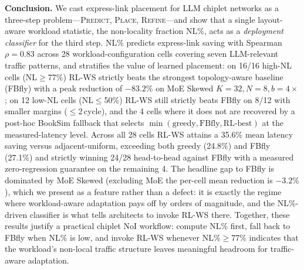 \documentclass[conference]{IEEEtran}
\begin{document}
\textbf{Conclusion.} We cast express-link placement for LLM chiplet networks as a three-step problem---\textsc{Predict}, \textsc{Place}, \textsc{Refine}---and show that a single layout-aware workload statistic, the non-locality fraction NL\%, acts as a \textit{deployment classifier} for the third step. NL\% predicts express-link saving with Spearman $\rho=0.83$ across 28 workload-configuration cells covering seven LLM-relevant traffic patterns, and stratifies the value of learned placement: on 16/16 high-NL cells (NL$\ge$77\%) RL-WS strictly beats the strongest topology-aware baseline (FBfly) with a peak reduction of $-83.2\%$ on MoE Skewed $K{=}32, N{=}8, b{=}4\times$; on 12 low-NL cells (NL$\le$50\%) RL-WS still strictly beats FBfly on 8/12 with smaller margins ($\le$2\,cycle), and the 4 cells where it does not are recovered by a post-hoc BookSim fallback that selects $\min(\text{greedy}, \text{FBfly}, \text{RL-best})$ at the measured-latency level. Across all 28 cells RL-WS attains a 35.6\% mean latency saving versus adjacent-uniform, exceeding both greedy (24.8\%) and FBfly (27.1\%) and strictly winning 24/28 head-to-head against FBfly with a measured zero-regression guarantee on the remaining 4. The headline gap to FBfly is dominated by MoE Skewed (excluding MoE the per-cell mean reduction is $-3.2\%$), which we present as a feature rather than a defect: it is exactly the regime where workload-aware adaptation pays off by orders of magnitude, and the NL\%-driven classifier is what tells architects to invoke RL-WS there. Together, these results justify a practical chiplet NoI workflow: compute NL\% first, fall back to FBfly when NL\% is low, and invoke RL-WS whenever NL\%$\ge$77\% indicates that the workload's non-local traffic structure leaves meaningful headroom for traffic-aware adaptation.
\end{document}
